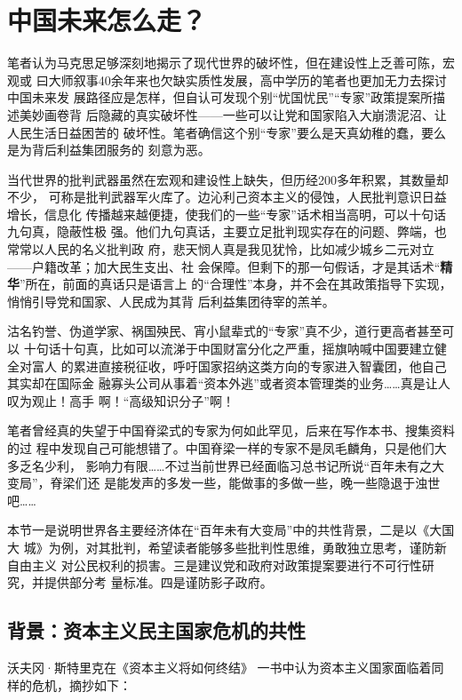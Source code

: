 \chapter{中国未来怎么走？}
\label{chap:future}

笔者认为马克思足够深刻地揭示了现代世界的破坏性，但在建设性上乏善可陈，宏观或
曰大师叙事40余年来也欠缺实质性发展，高中学历的笔者也更加无力去探讨中国未来发
展路径应是怎样，但自认可发现个别“忧国忧民”“专家”政策提案所描述美妙画卷背
后隐藏的真实破坏性——一些可以让党和国家陷入大崩溃泥沼、让人民生活日益困苦的
破坏性。笔者确信这个别“专家”要么是天真幼稚的蠢，要么是为背后利益集团服务的
刻意为恶。

当代世界的批判武器虽然在宏观和建设性上缺失，但历经200多年积累，其数量却不少，
可称是批判武器军火库了。边沁利己资本主义的侵蚀，人民批判意识日益增长，信息化
传播越来越便捷，使我们的一些“专家”话术相当高明，可以十句话九句真，隐蔽性极
强。他们九句真话，主要立足批判现实存在的问题、弊端，也常常以人民的名义批判政
府，悲天悯人真是我见犹怜，比如减少城乡二元对立——户籍改革；加大民生支出、社
会保障。但剩下的那一句假话，才是其话术“\textbf{精华}”所在，前面的真话只是语言上
的“合理性”本身，并不会在其政策指导下实现，悄悄引导党和国家、人民成为其背
后利益集团待宰的羔羊。

沽名钓誉、伪道学家、祸国殃民、宵小鼠辈式的“专家”真不少，道行更高者甚至可以
十句话十句真，比如可以流涕于中国财富分化之严重，摇旗呐喊中国要建立健全对富人
的累进直接税征收，呼吁国家招纳这类方向的专家进入智囊团，他自己其实却在国际金
融寡头公司从事着“资本外逃”或者资本管理类的业务……真是让人叹为观止！高手
啊！“高级知识分子”啊！

笔者曾经真的失望于中国脊梁式的专家为何如此罕见，后来在写作本书、搜集资料的过
程中发现自己可能想错了。中国脊梁一样的专家不是凤毛麟角，只是他们大多乏名少利，
影响力有限……不过当前世界已经面临习总书记所说“百年未有之大变局”，脊梁们还
是能发声的多发一些，能做事的多做一些，晚一些隐退于浊世吧……

本节一是说明世界各主要经济体在“百年未有大变局”中的共性背景，二是以《大国大
城》为例，对其批判，希望读者能够多些批判性思维，勇敢独立思考，谨防新自由主义
对公民权利的损害。三是建议党和政府对政策提案要进行不可行性研究，并提供部分考
量标准。四是谨防影子政府。


\section{背景：资本主义民主国家危机的共性}



沃夫冈·斯特里克在《资本主义将如何终结》\cite{JJDK201504024}\cite{streeck2017will}
一书中认为资本主义国家面临着同样的危机，摘抄如下：

